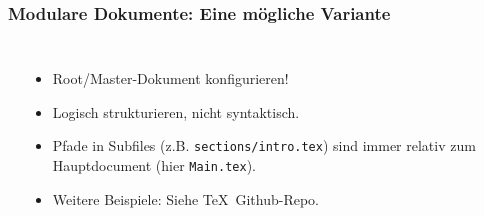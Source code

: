 \documentclass{beamer}                %
\newcommand*\code[1]{\texttt{#1}}
\begin{document}
\begin{frame}[fragile] %
    \frametitle{Modulare Dokumente: Eine m\"ogliche Variante}

    \begin{columns}
        {\small
        }



        \begin{itemize}
            \item
                Root/Master-Dokument konfigurieren!
            \item
                Logisch strukturieren, nicht syntaktisch.
            \item
                Pfade in Subfiles  (z.B. \code{sections/intro.tex}) sind immer
                relativ zum Hauptdocument (hier \code{Main.tex}).
            \item
                Weitere Beispiele: Siehe \TeX\ Github-Repo.
        \end{itemize}
    \end{columns}
\end{frame}
\end{document}

